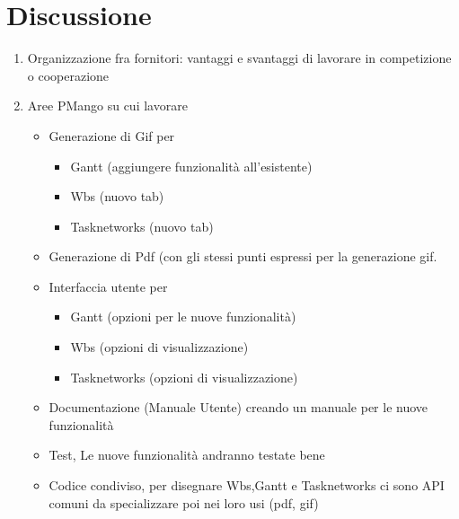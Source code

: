 \section*{Discussione}
\begin{enumerate}
\item Organizzazione fra fornitori: vantaggi e svantaggi di lavorare in competizione o cooperazione

\item Aree PMango su cui lavorare
\begin{itemize}

\item Generazione di Gif per 
	\begin{itemize}
		\item Gantt (aggiungere funzionalit\`a all'esistente)
		\item Wbs (nuovo tab)
		\item Tasknetworks (nuovo tab)
	\end{itemize}
\item Generazione di Pdf (con gli stessi punti espressi per la generazione gif.

\item Interfaccia utente per 
	\begin{itemize}
		\item Gantt (opzioni per le nuove funzionalit\`a)
		\item Wbs (opzioni di visualizzazione)
		\item Tasknetworks (opzioni di visualizzazione)
	\end{itemize}

\item  Documentazione (Manuale Utente) creando un manuale per le nuove funzionalit\`a

\item Test, Le nuove funzionalit\`a andranno testate bene

\item  Codice condiviso, per disegnare Wbs,Gantt e Tasknetworks ci sono API comuni da specializzare poi nei loro usi (pdf, gif)


\end{itemize}
\end{enumerate}
